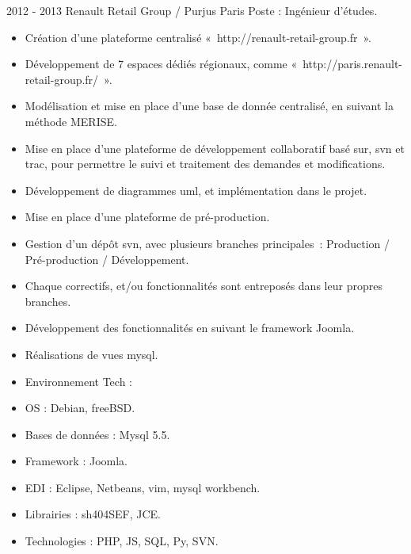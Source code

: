 \documentclass[print]{GuillaumeSeren-cv}
\begin{document}
\begin{entrylist}
  \entryBul
  {2012 - 2013}
  {Renault Retail Group / Purjus}
  {Paris}
  {Poste : Ingénieur d'études.}
  {
     \begin{itemize}[leftmargin=*]
       \setlength\itemsep{0pt}
       \item Création d'une plateforme centralisé « http://renault-retail-group.fr ».
       \item Développement de 7 espaces dédiés régionaux, comme « http://paris.renault-retail-group.fr/ ».
       \item Modélisation et mise en place d'une base de donnée centralisé, en suivant la méthode MERISE.
       \item Mise en place d'une plateforme de développement collaboratif basé sur, svn et trac, pour permettre le suivi et traitement des demandes et modifications.
       \item Développement de diagrammes uml, et implémentation dans le projet.
       \item Mise en place d'une plateforme de pré-production.
       \item Gestion d'un dépôt svn, avec plusieurs branches principales : Production / Pré-production / Développement.
       \item Chaque correctifs, et/ou fonctionnalités sont entreposés dans leur propres branches.
       \item Développement des fonctionnalités en suivant le framework Joomla.
       \item Réalisations de vues mysql.
       \item Environnement Tech :
       \item OS : Debian, freeBSD.
       \item Bases de données : Mysql 5.5.
       \item Framework : Joomla.
       \item EDI : Eclipse, Netbeans, vim, mysql workbench.
       \item Librairies : sh404SEF, JCE.
       \item Technologies : PHP, JS, SQL, Py, SVN.
     \end{itemize}
  }

\end{entrylist}
\newpage
\end{document}
